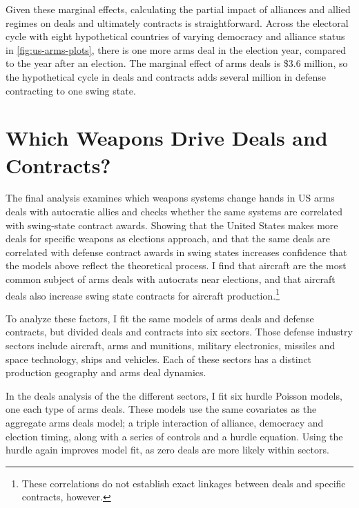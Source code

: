\documentclass[12pt]{article}
\begin{document}
Given these marginal effects, calculating the partial impact of alliances and allied regimes on deals and ultimately contracts is straightforward. 
Across the electoral cycle with eight hypothetical countries of varying democracy and alliance status in \autoref{fig:us-arms-plots}, there is one more arms deal in the election year, compared to the year after an election. 
The marginal effect of arms deals is \$3.6 million, so the hypothetical cycle in deals and contracts adds several million in defense contracting to one swing state. 
%
%

 


\section{Which Weapons Drive Deals and Contracts?} 


The final analysis examines which weapons systems change hands in US arms deals with autocratic allies and checks whether the same systems are correlated with swing-state contract awards. 
Showing that the United States makes more deals for specific weapons as elections approach, and that the same deals are correlated with defense contract awards in swing states increases confidence that the models above reflect the theoretical process. 
I find that aircraft are the most common subject of arms deals with autocrats near elections, and that aircraft deals also increase swing state contracts for aircraft production.\footnote{These correlations do not establish exact linkages between deals and specific contracts, however.}


To analyze these factors, I fit the same models of arms deals and defense contracts, but divided deals and contracts into six sectors. 
Those defense industry sectors include aircraft, arms and munitions, military electronics, missiles and space technology, ships and vehicles.  
Each of these sectors has a distinct production geography and arms deal dynamics.


In the deals analysis of the the different sectors, I fit six hurdle Poisson models, one each type of arms deals. 
These models use the same covariates as the aggregate arms deals model; a triple interaction of alliance, democracy and election timing, along with a series of controls and a hurdle equation.
Using the hurdle again improves model fit, as zero deals are more likely within sectors. 
\end{document}
